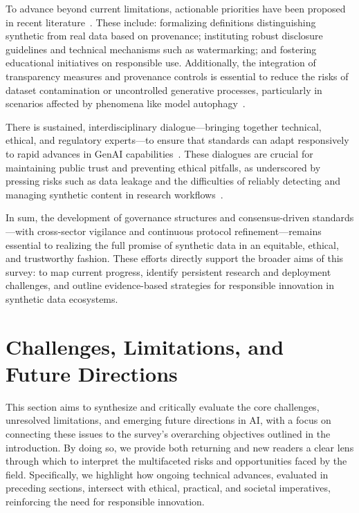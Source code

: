 \documentclass[sigconf]{acmart}
\begin{document}
To advance beyond current limitations, actionable priorities have been proposed in recent literature~\cite{ref7,ref82,ref88}. These include: formalizing definitions distinguishing synthetic from real data based on provenance; instituting robust disclosure guidelines and technical mechanisms such as watermarking; and fostering educational initiatives on responsible use. Additionally, the integration of transparency measures and provenance controls is essential to reduce the risks of dataset contamination or uncontrolled generative processes, particularly in scenarios affected by phenomena like model autophagy~\cite{ref82}.

There is sustained, interdisciplinary dialogue—bringing together technical, ethical, and regulatory experts—to ensure that standards can adapt responsively to rapid advances in GenAI capabilities~\cite{ref60,ref75,ref81,ref88}. These dialogues are crucial for maintaining public trust and preventing ethical pitfalls, as underscored by pressing risks such as data leakage and the difficulties of reliably detecting and managing synthetic content in research workflows~\cite{ref7,ref82}.

In sum, the development of governance structures and consensus-driven standards—with cross-sector vigilance and continuous protocol refinement—remains essential to realizing the full promise of synthetic data in an equitable, ethical, and trustworthy fashion. These efforts directly support the broader aims of this survey: to map current progress, identify persistent research and deployment challenges, and outline evidence-based strategies for responsible innovation in synthetic data ecosystems.

\section{Challenges, Limitations, and Future Directions}

This section aims to synthesize and critically evaluate the core challenges, unresolved limitations, and emerging future directions in AI, with a focus on connecting these issues to the survey’s overarching objectives outlined in the introduction. By doing so, we provide both returning and new readers a clear lens through which to interpret the multifaceted risks and opportunities faced by the field. Specifically, we highlight how ongoing technical advances, evaluated in preceding sections, intersect with ethical, practical, and societal imperatives, reinforcing the need for responsible innovation.
\end{document}
